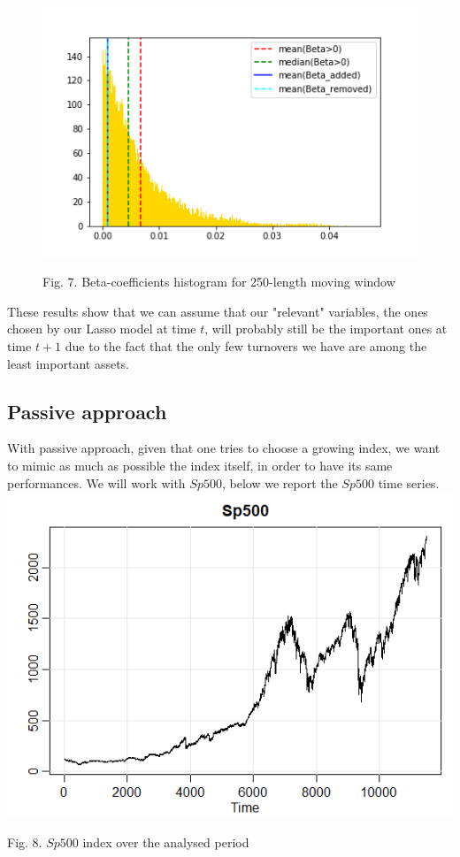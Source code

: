 \documentclass{article}%
\begin{document}
\begin{figure}[h!]
  \centering
  \includegraphics[scale=0.6]{turnover.png}
  \begin{center}
\begin{small}
Fig. 7. Beta-coefficients histogram for 250-length moving window
\end{small}
\end{center}
  \label{turnover}
\end{figure}
These results show that we can assume that our "relevant" variables, the ones chosen by our Lasso model at time $t$, will probably still be the important ones at time $t+1$ due to the fact that the only few turnovers we have are among the least important assets.


\subsection{Passive approach}

With passive approach, given that one tries to choose a growing index, we want to mimic as much as possible the index itself, in order to have its same performances.
We will work with $Sp500$, below we report the $Sp500$ time series.
\\


\includegraphics[scale=0.75]{sp500}
\begin{center}
\begin{small}
Fig. 8. $Sp500$ index over the analysed period
\\

\end{small}
\end{center}
\end{document}
